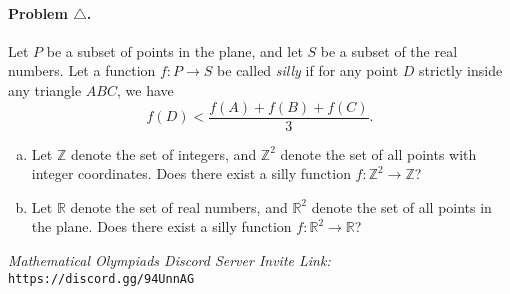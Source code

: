 \documentclass[11pt]{article}
\begin{document}
	\paragraph{Problem \(\triangle\).}
	Let \(P\) be a subset of points in the plane, and let \(S\) be a subset of the real numbers. Let a function \(f : P \rightarrow S\) be called \emph{silly} if for any point \(D\) strictly inside any triangle \(ABC\), we have \[f(D) < \frac{f(A) + f(B) + f(C)}{3}.\]
	\begin{enumerate}[(a)]
	\item Let \(\mathbb{Z}\) denote the set of integers, and \(\mathbb{Z}^2\) denote the set of all points with integer coordinates. Does there exist a silly function \(f : \mathbb{Z}^2 \rightarrow \mathbb{Z}\)?
	\item Let \(\mathbb{R}\) denote the set of real numbers, and \(\mathbb{R}^2\) denote the set of all points in the plane. Does there exist a silly function \(f : \mathbb{R}^2 \rightarrow \mathbb{R}\)?
	\end{enumerate}
	
	\vfill
	
	\noindent \makebox[\linewidth]{\rule{\textwidth}{0.4pt}}	
	
	\noindent \textit{Mathematical Olympiads Discord Server Invite Link:} \texttt{https://discord.gg/94UnnAG}
		
		
		
		
	
	
\end{document}
